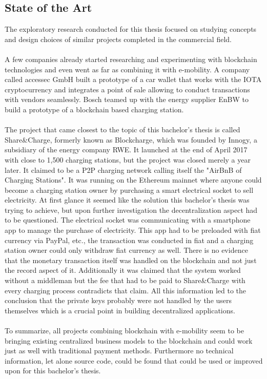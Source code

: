 \subsection{State of the Art}
The exploratory research conducted for this thesis focused on studying concepts and design choices of similar projects completed in the commercial field.
\\\\
A few companies already started researching and experimenting with blockchain technologies and even went as far as combining it with e-mobility.
A company called accessec GmbH built a prototype of a car wallet that works with the IOTA cryptocurrency and integrates a point of sale allowing to conduct transactions with vendors seamlessly\cite{car-wallet}.
Bosch teamed up with the energy supplier EnBW to build a prototype of a blockchain based charging station\cite{bosch-dlt}.
\\\\
The project that came closest to the topic of this bachelor’s thesis is called Share\&Charge, formerly known as Blockcharge\cite{share-charge}\cite{blockcharge}, which was founded by Innogy, a subsidiary of the energy company RWE\cite{innogy}.
It launched at the end of April 2017 with close to 1,500 charging stations, but the project was closed merely a year later\cite{share-charge-closed}.
It claimed to be a P2P charging network calling itself the "AirBnB of Charging Stations".
It was running on the Ethereum mainnet where anyone could become a charging station owner by purchasing a smart electrical socket to sell electricity.
At first glance it seemed like the solution this bachelor’s thesis was trying to achieve, but upon further investigation the decentralization aspect had to be questioned.
The electrical socket was communicating with a smartphone app to manage the purchase of electricity.
This app had to be preloaded with fiat currency via PayPal, etc., the transaction was conducted in fiat and a charging station owner could only withdraw fiat currency as well.
There is no evidence that the monetary transaction itself was handled on the blockchain and not just the record aspect of it.
Additionally it was claimed that the system worked without a middleman but the fee that had to be paid to Share\&Charge with every charging process contradicts that claim.
All this information led to the conclusion that the private keys probably were not handled by the users themselves which is a crucial point in building decentralized applications.
\\\\
To summarize, all projects combining blockchain with e-mobility seem to be bringing existing centralized business models to the blockchain and could work just as well with traditional payment methods.
Furthermore no technical information, let alone source code, could be found that could be used or improved upon for this bachelor’s thesis.
